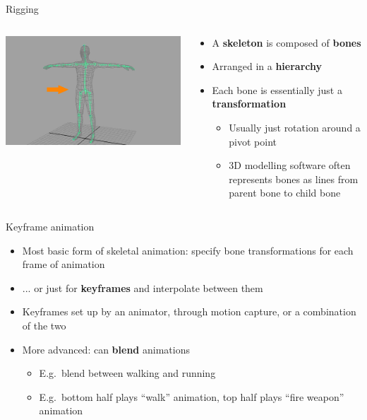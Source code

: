 \begin{frame}{Rigging}
	\begin{columns}
		\begin{column}{0.4\textwidth}
			\includegraphics[width=\textwidth]{human_rig}
		\end{column}
		\begin{column}{0.58\textwidth}
			\begin{itemize}
				\pause\item A \textbf{skeleton} is composed of \textbf{bones}
				\pause\item Arranged in a \textbf{hierarchy}
				\pause\item Each bone is essentially just a \textbf{transformation}
					\begin{itemize}
						\pause\item Usually just rotation around a pivot point
						\pause\item 3D modelling software often represents bones as lines from parent bone to child bone
					\end{itemize}
			\end{itemize}
		\end{column}
	\end{columns}
\end{frame}

\begin{frame}{Keyframe animation}
	\begin{itemize}
		\pause\item Most basic form of skeletal animation: specify bone transformations for each frame of animation
		\pause\item ... or just for \textbf{keyframes} and interpolate between them
		\pause\item Keyframes set up by an animator, through motion capture, or a combination of the two
		\pause\item More advanced: can \textbf{blend} animations
			\begin{itemize}
				\pause\item E.g.\ blend between walking and running
				\pause\item E.g.\ bottom half plays ``walk'' animation, top half plays ``fire weapon'' animation
			\end{itemize}
	\end{itemize}
\end{frame}

